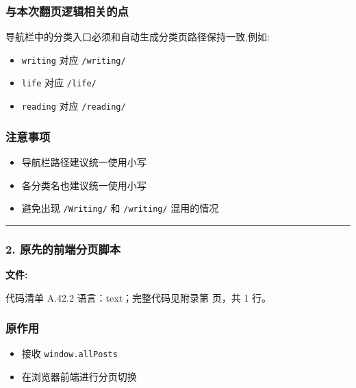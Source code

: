 \documentclass[lang=cn,scheme=chinese,color=blue,device=normal,toc=onecol,math=cm]{elegantbook}
\begin{document}
\subsubsection{与本次翻页逻辑相关的点}


导航栏中的分类入口必须和自动生成分类页路径保持一致,例如:\par


\begin{itemize}
\item \texttt{writing} 对应 \texttt{/\allowbreak{}writing/\allowbreak{}}
\item \texttt{life} 对应 \texttt{/\allowbreak{}life/\allowbreak{}}
\item \texttt{reading} 对应 \texttt{/\allowbreak{}reading/\allowbreak{}}
\end{itemize}


\subsubsection{注意事项}


\begin{itemize}
\item 导航栏路径建议统一使用小写
\item 各分类名也建议统一使用小写
\item 避免出现 \texttt{/\allowbreak{}Writing/\allowbreak{}} 和 \texttt{/\allowbreak{}writing/\allowbreak{}} 混用的情况
\end{itemize}


\medskip\hrule\medskip


\subsubsection{2. 原先的前端分页脚本}


\textbf{文件:}\par


\begin{codeindexbox}{代码清单 A.42.2}
语言：text；完整代码见附录第 \pageref{code:42:2} 页，共 1 行。
\end{codeindexbox}


\subsubsection{原作用}


\begin{itemize}
\item 接收 \texttt{window.allPosts}
\item 在浏览器前端进行分页切换
\end{itemize}
\end{document}
